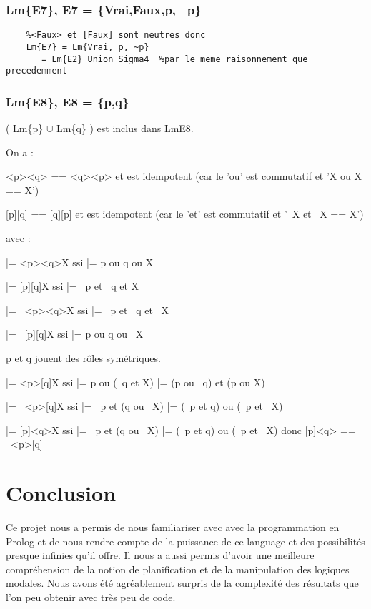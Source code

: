 \documentclass[a4paper,10pt]{article}
\begin{document}
	
	
   \subsubsection{Lm\{E7\}, E7 = \{Vrai,Faux,p, ~p\}}
   
     \begin{lstlisting}
    %<Faux> et [Faux] sont neutres donc
    Lm{E7} = Lm{Vrai, p, ~p}
	   = Lm{E2} Union Sigma4  %par le meme raisonnement que precedemment
	\end{lstlisting}
   
   \subsubsection{Lm\{E8\}, E8 = \{p,q\}}
    
        ( Lm\{p\} $\cup$ Lm\{q\} ) est inclus dans Lm{E8}.

	On a :
	
	<p><q> == <q><p> et est idempotent (car le 'ou' est commutatif et 'X ou X == X')
	
	[p][q] == [q][p] et est idempotent (car le 'et' est commutatif et '~X et ~X == X')
	
	avec :
	
	|= <p><q>X ssi |= p ou q ou X

	|= [p][q]X ssi |= ~p et ~q et X

	|= ~<p><q>X ssi |= ~p et ~q et ~X

	|= ~[p][q]X ssi |= p ou q ou ~X

	
	p et q jouent des rôles symétriques.
	
	|= <p>[q]X ssi |= p ou (~q et X) |= (p ou ~q) et (p ou X)

	|= ~<p>[q]X ssi |= ~p et (q ou ~X) |= (~p et q) ou (~p et ~X)

	|= [p]<q>X ssi |= ~p et (q ou ~X) |= (~p et q) ou (~p et ~X)  donc [p]<q> == ~<p>[q]
  
 \section{Conclusion}
      Ce projet nous a permis de nous familiariser avec avec la programmation en Prolog et de nous rendre compte de la puissance de ce language et des possibilités presque 
      infinies qu'il offre. Il nous a aussi permis d'avoir une meilleure compréhension de la notion de planification et de la manipulation des logiques modales. Nous avons
      été agréablement surpris de la complexité des résultats que l'on peu obtenir avec très peu de code.
 
 
  
\end{document}
